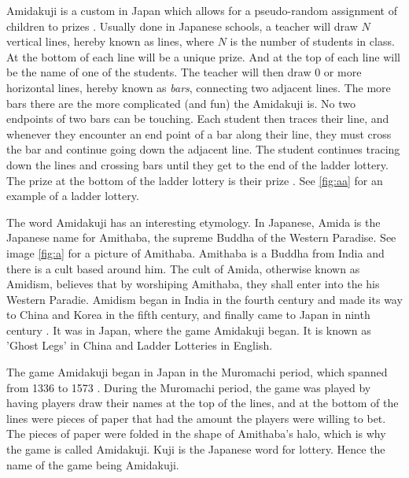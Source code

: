 
Amidakuji is a custom in Japan which 
allows for a pseudo-random assignment of children to prizes \cite{A1}. 
Usually done in Japanese schools, a teacher will draw $N$ vertical lines, 
hereby known as lines, where $N$ is the number of students in class. 
At the bottom of each line will be a unique prize. 
And at the top of each line will be the name of one of the students.  
The teacher will then draw 0 or more horizontal lines, hereby known as \emph{bars}, 
connecting two adjacent lines. The more bars there are the more complicated (and fun) 
the Amidakuji is. No two endpoints of two bars can be touching. Each student then traces 
their line, and whenever they encounter an end point of a bar along their line, 
they must cross the bar and continue going down the adjacent line. 
The student continues tracing down the lines and crossing bars 
until they get to the end of the ladder lottery. The prize at the bottom of the ladder lottery 
is their prize \cite{A1}. See \ref{fig:aa} for an example of a ladder lottery.\par
The word Amidakuji has an interesting etymology. In Japanese, Amida is the Japanese name 
for Amithaba, the supreme Buddha of the Western Paradise. See image \ref{fig:a}
for a picture of Amithaba. Amithaba
is a Buddha from India and there is a cult based around him. The cult 
of Amida, otherwise known as Amidism, believes that by worshiping Amithaba, they shall 
enter into the his Western Paradie.\cite{A0} Amidism began in India in the fourth century
and made its way to China and Korea in the fifth century, and finally  came 
to Japan in ninth century \cite{A0}. It was in Japan, where the game Amidakuji
began. It is known as 'Ghost Legs' in China and Ladder Lotteries in English.\par
The game Amidakuji began in Japan in the Muromachi period, which spanned from
1336 to 1573 \cite{A0}. During the Muromachi period, the game was played by having
players draw their names at the top of the lines, and at the bottom 
of the lines were pieces of paper that had the amount the players
were willing to bet. The pieces of paper were folded in the shape of 
Amithaba's halo, which is why the game is called Amidakuji. Kuji 
is the Japanese word for lottery. Hence the name of the game being 
Amidakuji.\par 





